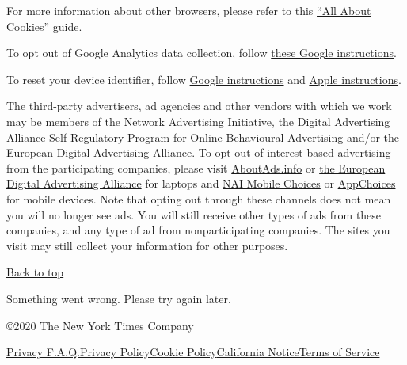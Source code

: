 For more information about other browsers, please refer to this
\href{https://www.allaboutcookies.org/manage-cookies/}{``All About
Cookies'' guide}.

To opt out of Google Analytics data collection, follow
\href{https://tools.google.com/dlpage/gaoptout}{these Google
instructions}.

To reset your device identifier, follow
\href{https://support.google.com/googleplay/android-developer/answer/6048248?hl=en}{Google
instructions} and \href{https://support.apple.com/en-us/HT205223}{Apple
instructions}.

The third-party advertisers, ad agencies and other vendors with which we
work may be members of the Network Advertising Initiative, the Digital
Advertising Alliance Self-Regulatory Program for Online Behavioural
Advertising and/or the European Digital Advertising Alliance. To opt out
of interest-based advertising from the participating companies, please
visit \href{http://optout.aboutads.info/?c=2\&lang=EN}{AboutAds.info} or
\href{http://www.youronlinechoices.eu/}{the European Digital Advertising
Alliance} for laptops and
\href{https://www.networkadvertising.org/mobile-choice/}{NAI Mobile
Choices} or \href{https://youradchoices.com/appchoices}{AppChoices} for
mobile devices. Note that opting out through these channels does not
mean you will no longer see ads. You will still receive other types of
ads from these companies, and any type of ad from nonparticipating
companies. The sites you visit may still collect your information for
other purposes.

\href{app}{Back to top}

Something went wrong. Please try again later.

©2020 The New York Times Company

\href{/privacy}{Privacy F.A.Q.}\href{/privacy/privacy-policy}{Privacy
Policy}\href{/privacy/cookie-policy}{Cookie
Policy}\href{/privacy/california-notice}{California
Notice}\href{https://help.nytimes3xbfgragh.onion/hc/en-us/articles/115014893428-Terms-of-service}{Terms
of Service}
